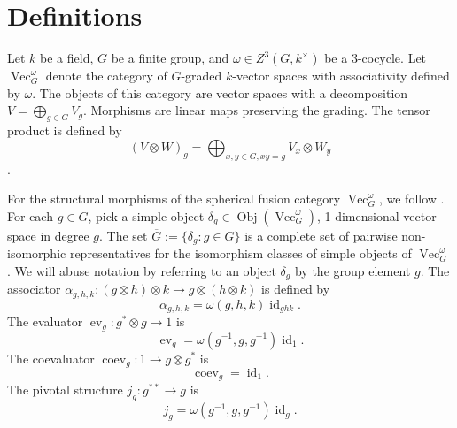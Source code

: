 \documentclass{amsart}
\DeclareMathOperator{\id}{id}
\DeclareMathOperator{\Vect}{Vec}
\DeclareMathOperator{\Obj}{Obj}
\DeclareMathOperator{\coev}{coev}
\DeclareMathOperator{\ev}{ev}
\begin{document}
\section{Definitions}


Let $k$ be a field,  $G$ be a finite group, and $\omega \in Z^3(G, k^\times)$ be a 3-cocycle.    Let  $\Vect_G^\omega$  denote the category of $G$-graded $k$-vector spaces with associativity defined by $\omega$.  
The objects of this category are vector spaces with a decomposition $V = \bigoplus_{g \in G} V_g$. Morphisms are linear maps preserving the grading. The tensor product is defined by
$$ (V \otimes W)_g = \bigoplus_{x,y \in G, xy = g} V_x \otimes W_y $$.


For the structural morphisms of the spherical fusion category $\Vect_G^\omega$, we follow \cite{math/0601012}.  For each $g \in G$, pick a simple object $\delta_g \in \Obj(\Vect_G^\omega)$,  1-dimensional vector space in degree $g$.  The set $\overline{G} := \{\delta_g : g \in G\}$ is a complete set of pairwise non-isomorphic representatives for the isomorphism classes of simple objects of $\Vect_G^\omega$.  We will abuse notation by referring to an object $\delta_g$ by the group element $g$.  The associator $\alpha_{g,h,k}:(g \otimes h) \otimes k \to g \otimes (h \otimes k)$ is defined by
$$\alpha_{g,h,k} = \omega(g,h,k) \id_{{ghk}}.$$ 
The evaluator $\ev_g:g^* \otimes g \to 1$ is 
$$\ev_{g} = \omega(g^{-1},g,g^{-1}) \id_1.$$  
The coevaluator $\coev_g:1 \to g \otimes g^*$ is 
$$\coev_{g} = \id_1.$$ 
The pivotal structure $j_g:g^{**} \to g$ is 
$$j_{g} = \omega(g^{-1},g,g^{-1}) \id_{g}.$$

\newcommand{\ee}{\mathbf{e}}       %
\newcommand{\A}{\mathcal{A}}      %
\newcommand{\st}{\; | \;}                               %
\newcommand{\ttt}{\otimes}                              %
\newcommand{\cc}[1]{\underset{\scriptstyle #1}{\circ}}
\newcommand{\ccc}[1]{\underset{\scriptstyle #1}{\bullet}}
\newcommand{\ti}{\tilde}
\newcommand{\ov}{\overline}
\newcommand{\del}{\partial}
\newcommand{\<}{\langle}
\renewcommand{\>}{\rangle}
\newcommand{\surjto}{\twoheadrightarrow}      %
\newcommand{\injto}{\hookrightarrow}          %
\newcommand{\isoto}{\xrightarrow{\sim}}       %
\newcommand{\xxto}{\xrightarrow}              %
\newcommand{\firef}[1]{Figure~{\rm\ref{#1}}}
\newcommand{\R}{\mathbb{R}}       %
\end{document}
